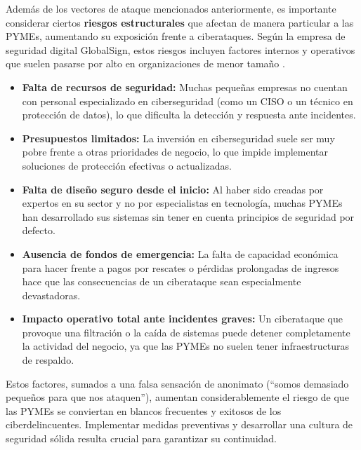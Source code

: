 \documentclass[a4paper, 11pt]{article}
\begin{document}
\par\vspace{0.5cm}
Además de los vectores de ataque mencionados anteriormente, es importante considerar ciertos \textbf{riesgos estructurales} que afectan de manera particular a las PYMEs, aumentando su exposición frente a ciberataques. Según la empresa  de seguridad digital GlobalSign, estos riesgos incluyen factores internos y operativos que suelen pasarse por alto en organizaciones de menor tamaño \cite{toms2021}. 
\begin{itemize}
  \item \textbf{Falta de recursos de seguridad:} Muchas pequeñas empresas no cuentan con personal especializado en ciberseguridad (como un CISO o un técnico en protección de datos), lo que dificulta la detección y respuesta ante incidentes.
  \item \textbf{Presupuestos limitados:} La inversión en ciberseguridad suele ser muy pobre frente a otras prioridades de negocio, lo que impide implementar soluciones de protección efectivas o actualizadas.
  \item \textbf{Falta de diseño seguro desde el inicio:} Al haber sido creadas por expertos en su sector y no por especialistas en tecnología, muchas PYMEs han desarrollado sus sistemas sin tener en cuenta principios de seguridad por defecto.
  \item \textbf{Ausencia de fondos de emergencia:} La falta de capacidad económica para hacer frente a pagos por rescates o pérdidas prolongadas de ingresos hace que las consecuencias de un ciberataque sean especialmente devastadoras.
  \item \textbf{Impacto operativo total ante incidentes graves:} Un ciberataque que provoque una filtración o la caída de sistemas puede detener completamente la actividad del negocio, ya que las PYMEs no suelen tener infraestructuras de respaldo.
\end{itemize}

\par\vspace{0.5cm}
Estos factores, sumados a una falsa sensación de anonimato (“somos demasiado pequeños para que nos ataquen”), aumentan considerablemente el riesgo de que las PYMEs se conviertan en blancos frecuentes y exitosos de los ciberdelincuentes. 
Implementar medidas preventivas y desarrollar una cultura de seguridad sólida resulta crucial para garantizar su continuidad. 

\par\vspace{0.5cm}
\end{document}
